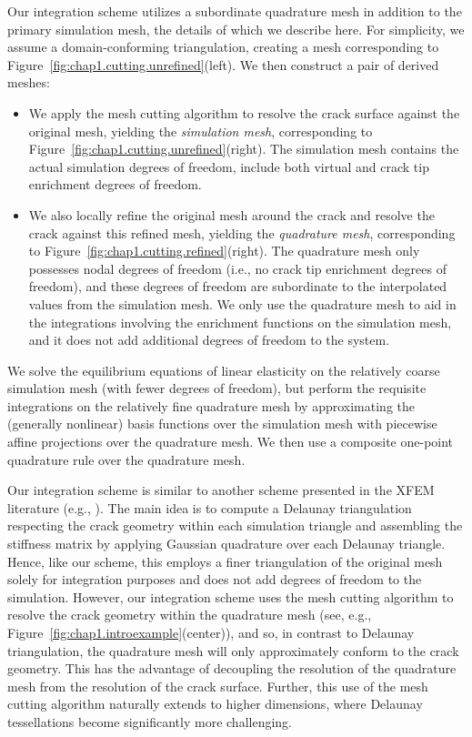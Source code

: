 Our integration scheme utilizes a subordinate quadrature mesh in addition to the primary simulation mesh, the details of which we describe here. For simplicity, we assume a domain-conforming triangulation, creating a mesh corresponding to Figure~\ref{fig:chap1.cutting.unrefined}(left). We then construct a pair of derived meshes:
\begin{itemize}
\item We apply the mesh cutting algorithm to resolve the crack surface against the original mesh, yielding the \emph{simulation mesh}, corresponding to Figure~\ref{fig:chap1.cutting.unrefined}(right). The simulation mesh contains the actual simulation degrees of freedom, include both virtual and crack tip enrichment degrees of freedom.
\item We also locally refine the original mesh around the crack and resolve the crack against this refined mesh, yielding the \emph{quadrature mesh}, corresponding to Figure~\ref{fig:chap1.cutting.refined}(right). The quadrature mesh only possesses nodal degrees of freedom (i.e., no crack tip enrichment degrees of freedom), and these degrees of freedom are subordinate to the interpolated values from the simulation mesh. We only use the quadrature mesh to aid in the integrations involving the enrichment functions on the simulation mesh, and it does not add additional degrees of freedom to the system.
\end{itemize}
We solve the equilibrium equations of linear elasticity on the relatively coarse simulation mesh (with fewer degrees of freedom), but perform the requisite integrations on the relatively fine quadrature mesh by approximating the (generally nonlinear) basis functions over the simulation mesh with piecewise affine projections over the quadrature mesh. We then use a composite one-point quadrature rule over the quadrature mesh.

Our integration scheme is similar to another scheme presented in the XFEM literature (e.g., \cite{Stazi03}). The main idea is to compute a Delaunay triangulation respecting the crack geometry within each simulation triangle and assembling the stiffness matrix by applying Gaussian quadrature over each Delaunay triangle. Hence, like our scheme, this employs a finer triangulation of the original mesh solely for integration purposes and does not add degrees of freedom to the simulation. However, our integration scheme uses the mesh cutting algorithm \cite{Sifakis07} to resolve the crack geometry within the quadrature mesh (see, e.g., Figure~\ref{fig:chap1.introexample}(center)), and so, in contrast to Delaunay triangulation, the quadrature mesh will only approximately conform to the crack geometry. This has the advantage of decoupling the resolution of the quadrature mesh from the resolution of the crack surface. Further, this use of the mesh cutting algorithm naturally extends to higher dimensions, where Delaunay tessellations become significantly more challenging.

